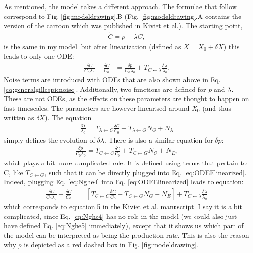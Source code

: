 As mentioned, the  model takes a different approach. 
The formulae that follow correspond to Fig. \ref{fig:modeldrawing}.B (Fig. \ref{fig:modeldrawing}.A contains the version of the cartoon which was published in Kiviet et al.).
The starting point,
%
\begin{align}
\label{eq:Nghe1}
\dot{C} = p - \lambda C
,
\end{align}
%
is the same in my model, but after linearization (defined as $X=X_0+\delta X$) this leads to only one ODE:
%
\begin{align}
\label{eq:ODEElinearized}
\frac{ \delta{\dot{C}} }{C_0 \lambda_0} 
+ \frac{\delta C}{C_0} 
& =
\frac{\delta p}{C_0 \lambda_0} + T_{C \leftarrow \lambda} \frac{\delta \lambda}{\lambda_0}
.
\end{align}
%
Noise terms are introduced with ODEs that are also shown above in Eq. \ref{eq:generalgillespienoise}.
 Additionally, two functions are defined for $p$ and $\lambda$. These are not ODEs, as the effects on these parameters are thought to happen on fast timescales. The parameters are however linearised around $X_0$ (and thus written as $\delta X$). The equation
%
\begin{align}
\label{eq:Nghe3}
\frac{\delta\lambda}{\lambda_0} = T_{\lambda \leftarrow C} \frac{\delta C}{C_0} + T_{\lambda \leftarrow G} N_G + N_\lambda
\end{align}
%
simply defines the evolution of $\delta \lambda$.
There is also a similar equation for $\delta p$:
%
\begin{align}
\label{eq:Nghe4}
\frac{\delta{p}}{C_0 \lambda_0} = T_{C \leftarrow C} \frac{\delta C}{C_0} + T_{C \leftarrow G} N_G + N_E
,
\end{align}
%
which plays a bit more complicated role.
It is defined using terms that pertain to C, like $T_{C \leftarrow G}$, such that it can be directly plugged into Eq. \ref{eq:ODEElinearized}. 
Indeed, plugging Eq. \ref{eq:Nghe4} into Eq. \ref{eq:ODEElinearized} leads to equation:
%
\begin{align}
\label{eq:Nghe5}
\frac{ \delta{\dot{C}} }{C_0 \lambda_0} 
+ \frac{\delta C}{C_0} 
& = 
\left[
 T_{C \leftarrow C} \frac{\delta C}{C_0} + T_{C \leftarrow G} N_G + N_E 
 \right]
 + T_{C \leftarrow \lambda} \frac{\delta \lambda}{\lambda_0} 
\end{align}
%
which corresponds to equation 5 in the Kiviet et al. \cite{Kiviet2014} manuscript.
I say it is a bit complicated, since Eq. \ref{eq:Nghe4} has no role in the model (we could also just have defined Eq. \ref{eq:Nghe5} immediately), except that it shows us which part of the model can be interpreted as being the production rate.
This is also the reason why $p$ is depicted as a red dashed box in Fig. \ref{fig:modeldrawing}.

